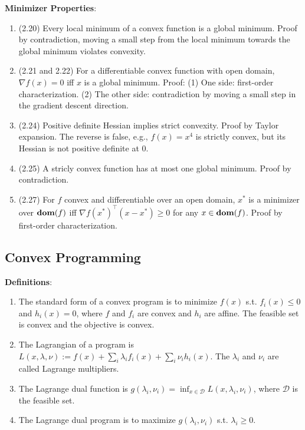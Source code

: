 \textbf{Minimizer Properties}:
\begin{enumerate}
    \item (2.20) Every local minimum of a convex function is a global minimum. Proof by contradiction, moving a small step from the local minimum towards the global minimum violates convexity.
    \item (2.21 and 2.22) For a differentiable convex function with open domain, $\nabla f(x) = 0$ iff $x$ is a global minimum. Proof: (1) One side: first-order characterization. (2) The other side: contradiction by moving a small step in the gradient descent direction.
    \item (2.24) Positive definite Hessian implies strict convexity. Proof by Taylor expansion. The reverse is false, e.g., $f(x)=x^4$ is strictly convex, but its Hessian is not positive definite at 0.
    \item (2.25) A stricly convex function has at most one global minimum. Proof by contradiction.
    \item (2.27) For $f$ convex and differentiable over an open domain, $x^*$ is a minimizer over $\operatorname{\textbf{dom}}(f)$ iff $\nabla f(x^*)^\top (x-x^*) \ge 0$ for any $x \in \operatorname{\textbf{dom}}(f)$. Proof by first-order characterization.
\end{enumerate}

\subsection{Convex Programming}

\textbf{Definitions}:
\begin{enumerate}
    \item The standard form of a convex program is to minimize $f(x)$ s.t. $f_i(x) \le 0$ and $h_i(x) =0$, where $f$ and $f_i$ are convex and $h_i$ are affine. The feasible set is convex and the objective is convex.
    \item The Lagrangian of a program is $L(x, \lambda, \nu):= f(x) + \sum_i \lambda_i f_i(x) + \sum_i \nu_i h_i(x)$. The $\lambda_i$ and $\nu_i$ are called Lagrange multipliers.
    \item The Lagrange dual function is $g(\lambda_i, \nu_i) = \inf_{x\in\mathcal{D}} L(x, \lambda_i, \nu_i)$, where $\mathcal{D}$ is the feasible set.
    \item The Lagrange dual program is to maximize $g(\lambda_i, \nu_i)$ s.t. $\lambda_i \ge 0$.
\end{enumerate}


